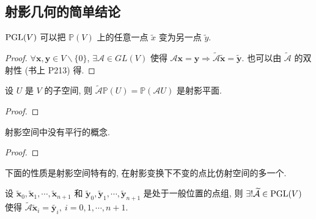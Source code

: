 \documentclass[color=black,device=normal,lang=cn,mode=geye]{elegantnote}
\begin{document}
\subsection{射影几何的简单结论}
\begin{theorem}
    $\operatorname{PGL} (V)$ 可以把 $\mathbb{P}(V)$ 上的任意一点 $\tilde{x}$ 变为另一点 $\tilde{y}$.
\end{theorem}
\begin{proof}
    $\forall\boldsymbol{x},\boldsymbol{y}\in V\backslash\{0\}$, $\exists\mathcal{A}\in GL (V)$ 使得 $\mathcal{A}\boldsymbol{x}=\boldsymbol{y}\Rightarrow\widetilde{\mathcal{A}}\tilde{\boldsymbol{x}}=\tilde{\boldsymbol{y}}$. 也可以由 $\widetilde{\mathcal{A}}$ 的双射性 (书上 P213) 得.
\end{proof}
\begin{theorem}
    设 $U$ 是 $V$ 的子空间, 则 $\widetilde{\mathcal{A}}\mathbb{P}(U)=\mathbb{P}(\mathcal{A}U)$ 是射影平面.
\end{theorem}
\begin{proof}
    
\end{proof}
\begin{theorem}
    射影空间中没有平行的概念.
\end{theorem}
\begin{proof}
    
\end{proof}
下面的性质是射影空间特有的, 在射影变换下不变的点比仿射空间的多一个.
\begin{theorem}[书上的定理 3]\label{t3.10}
    设 $\tilde{\boldsymbol{x}}_0,\tilde{\boldsymbol{x}}_1,\cdots,\tilde{\boldsymbol{x}}_{n+1}$ 和 $\tilde{\boldsymbol{y}}_0,\tilde{\boldsymbol{y}}_1,\cdots,\tilde{\boldsymbol{y}}_{n+1}$ 是处于一般位置的点组, 则 $\exists!\widetilde{\mathcal{A}}\in\operatorname{PGL} (V)$ 使得 $\widetilde{\mathcal{A}}\tilde{\boldsymbol{x}}_i=\tilde{\boldsymbol{y}_i},\ i=0,1,\cdots,n+1$.
\end{theorem}
\end{document}
